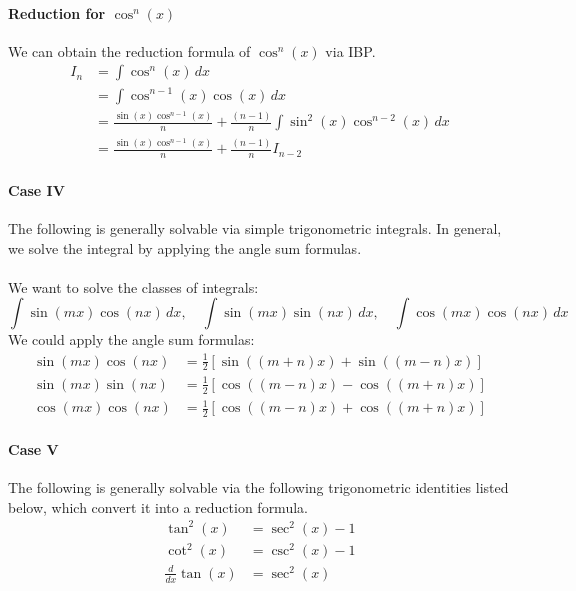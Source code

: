 \documentclass[11pt]{report}
\begin{document}
\paragraph{Reduction for $\cos^n(x)$} We can obtain the reduction formula of $\cos^n(x)$ via IBP.
\begin{align}
    I_n &= \int \cos^n(x) \, dx \nonumber \\
    &= \int \cos^{n-1}(x) \cos(x) \, dx \nonumber \\
    &= \frac{\sin(x) \cos^{n-1}(x)}{n} + \frac{(n-1)}{n} \int \sin^2(x) \cos^{n-2}(x) \, dx \nonumber \\
    &= \frac{\sin(x) \cos^{n-1}(x)}{n} + \frac{(n-1)}{n} I_{n-2}
\end{align} 
\paragraph{Case IV} The following is generally solvable via simple trigonometric integrals. In general, we solve the integral by applying the angle sum formulas.
\paragraph{} We want to solve the classes of integrals:
\begin{equation}
    \int \sin(mx) \cos(nx) \, dx, \quad \int \sin(mx) \sin(nx) \, dx, \quad \int \cos(mx) \cos(nx) \, dx 
\end{equation}
We could apply the angle sum formulas:
\begin{align}
    \sin(mx)\cos(nx) &= \frac{1}{2} \left[ \sin((m+n)x) + \sin((m-n)x) \right] \\
    \sin(mx)\sin(nx) &= \frac{1}{2} \left[ \cos((m-n)x) - \cos((m+n)x) \right] \\
    \cos(mx)\cos(nx) &= \frac{1}{2} \left[ \cos((m-n)x) + \cos((m+n)x) \right]
\end{align}
\paragraph{Case V} The following is generally solvable via the following trigonometric identities listed below, which convert it into a reduction formula.
\begin{align}
    \tan^2(x) &= \sec^2(x) - 1 \label{eq:tan2} \\
    \cot^2(x) &= \csc^2(x) - 1 \label{eq:cot2}  \\
    \frac{d}{dx} \tan(x) &= \sec^2(x)
\end{align}
\end{document}
